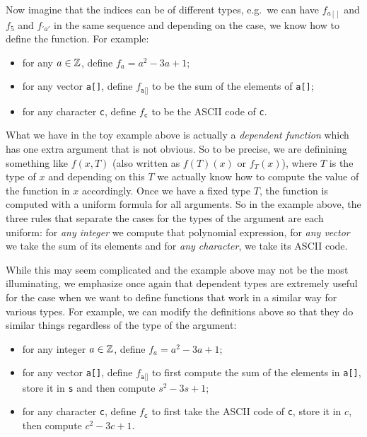 Now imagine that the indices can be of different types, e.g.\ we can
have $ f_{a[]} $ and $ f_5 $ and $ f_{'a'} $ in the same sequence and depending
on the case, we know how to define the function. For example:
\begin{itemize}
\item for any $ a \in \mathbb{Z} $, define $ f_a = a^2 - 3a + 1 $;
\item for any vector \texttt{a[]}, define $ f_{\texttt{a[]}} $ to be the sum
  of the elements of \texttt{a[]};
\item for any character \texttt{c}, define $ f_{\texttt{c}} $ to be the ASCII code
  of \texttt{c}.
\end{itemize}

What we have  in the toy example above is actually a
\emph{dependent function} which has one extra argument that is not obvious.
So to be precise, we are definining something like $ f(x, T) $
(also written as $ f(T)(x) $ or $ f_T(x) $), where $ T $ is the type of $ x $
and depending on this $ T $ we actually know how to compute the value
of the function in $ x $ accordingly. Once we have a fixed type $ T $,
the function is computed with a uniform formula for all arguments.
So in the example above, the three rules that separate the cases for the
types of the argument are each uniform: for \emph{any integer} we compute
that polynomial expression, for \emph{any vector} we take the sum of
its elements and for \emph{any character}, we take its ASCII code.

While this may seem complicated and the example above may not be the most
illuminating, we emphasize once again that dependent types are extremely
useful for the case when we want to define functions that work in a similar
way for various types. For example, we can modify the definitions above
so that they do similar things regardless of the type of the argument:
\begin{itemize}
\item for any integer $ a \in \mathbb{Z} $, define $ f_a = a^2 - 3a + 1 $;
\item for any vector \texttt{a[]}, define $ f_{\texttt{a[]}} $ to first compute
  the sum of the elements in \texttt{a[]}, store it in \texttt{s}
  and then compute $ s^2 - 3s + 1 $;
\item for any character \texttt{c}, define $ f_{\texttt{c}} $ to first take the
  ASCII code of \texttt{c}, store it in $ c $, then compute
  $ c^2 - 3c + 1 $.
\end{itemize}

